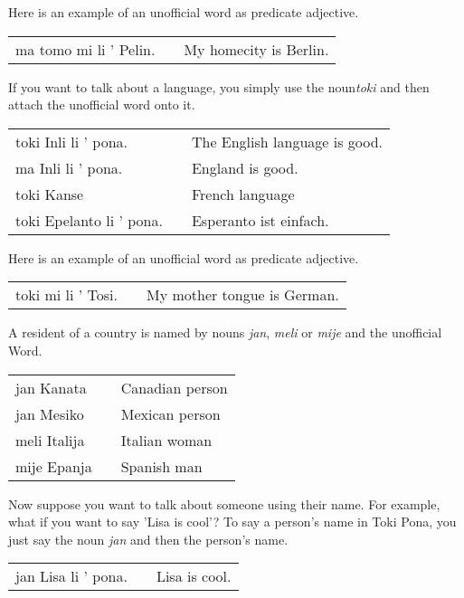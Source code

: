 Here is an example of an unofficial word as predicate adjective.

\begin{supertabular}{p{5,5cm}|ll}
    ma tomo mi li ' Pelin. &  & My homecity is Berlin. \\
\end{supertabular}

If you want to talk about a language, you simply use the noun\textit{toki} and then attach the unofficial word onto it.

\begin{supertabular}{p{5,5cm}|ll}
    toki Inli li ' pona.     &  & The English language is good. \\
    ma Inli li ' pona.       &  & England is good.              \\
    toki Kanse               &  & French language               \\
    toki Epelanto li ' pona. &  & Esperanto ist einfach.        \\
\end{supertabular}

Here is an example of an unofficial word as predicate adjective.

\begin{supertabular}{p{5,5cm}|ll}
    toki mi li ' Tosi. &  & My mother tongue is German. \\
\end{supertabular}

A resident of a country is named by nouns \textit{jan}, \textit{meli} or \textit{mije} and the unofficial Word.

\begin{supertabular}{p{5,5cm}|ll}
    jan Kanata   &  & Canadian person \\
    jan Mesiko   &  & Mexican person  \\
    meli Italija &  & Italian woman   \\
    mije Epanja  &  & Spanish man     \\
\end{supertabular}

Now suppose you want to talk about someone using their name.
For example, what if you want to say 'Lisa is cool'?
To say a person's name in Toki Pona, you just say the noun \textit{jan} and then the person's name.

\begin{supertabular}{p{5,5cm}|ll}
    jan Lisa li ' pona. &  & Lisa is cool. \\
\end{supertabular}

